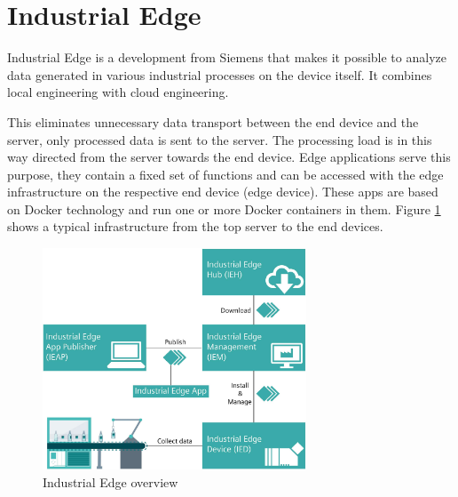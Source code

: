 	\section{Industrial Edge}
	\label{Grundlagen:IndustrialEdge}
		
	Industrial Edge is a development from Siemens that makes it possible to analyze data generated in various industrial processes on the device itself. It combines local engineering with cloud engineering.\cite{siemensIndustrialEdge}

	This eliminates unnecessary data transport between the end device and the server, only processed data is sent to the server. The processing load is in this way directed from the server towards the end device. Edge applications serve this purpose, they contain a fixed set of functions and can be accessed with the edge infrastructure on the respective end device (edge device). These apps are based on Docker technology and run one or more Docker containers in them. Figure \ref{fig:Grundlagen:IndustrialEdge:Ueberblick} shows a typical infrastructure from the top server to the end devices.

		\begin{figure}[h]
			\centering
			\includegraphics[width=0.70\textwidth]{"Bilder/Edge_uebersicht.jpg"}
			\caption{Industrial Edge overview \cite{siemensIEM_gettingStarted}}
			\label{fig:Grundlagen:IndustrialEdge:Ueberblick}					
		\end{figure}
	
			
